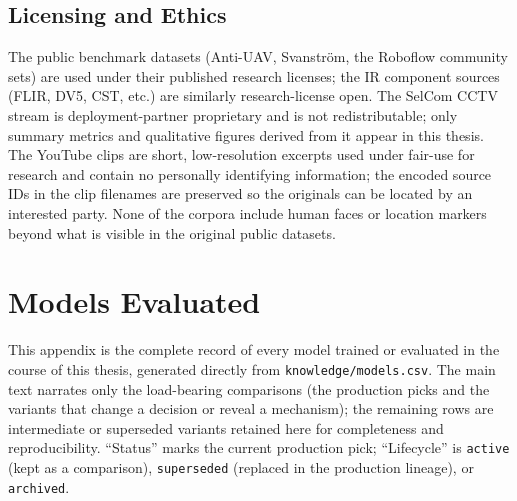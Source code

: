 \section{Licensing and Ethics}

The public benchmark datasets (Anti-UAV, Svanstr\"om, the Roboflow community sets) are used under their published research licenses; the IR component sources (FLIR, DV5, CST, etc.) are similarly research-license open. The SelCom CCTV stream is deployment-partner proprietary and is not redistributable; only summary metrics and qualitative figures derived from it appear in this thesis. The YouTube clips are short, low-resolution excerpts used under fair-use for research and contain no personally identifying information; the encoded source IDs in the clip filenames are preserved so the originals can be located by an interested party. None of the corpora include human faces or location markers beyond what is visible in the original public datasets.

\chapter{Models Evaluated}
\label{app:models}

This appendix is the complete record of every model trained or evaluated in the course of this thesis, generated directly from \texttt{knowledge/models.csv}. The main text narrates only the load-bearing comparisons (the production picks and the variants that change a decision or reveal a mechanism); the remaining rows are intermediate or superseded variants retained here for completeness and reproducibility. ``Status'' marks the current production pick; ``Lifecycle'' is \texttt{active} (kept as a comparison), \texttt{superseded} (replaced in the production lineage), or \texttt{archived}.

